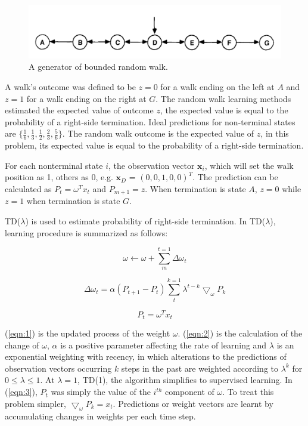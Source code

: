 \documentclass[conference]{IEEEtran}
\begin{document}
\begin{figure}[htbp]
\includegraphics[width=\linewidth]{randomwalk.png}
\caption{A generator of bounded random walk.}
\label{fig1}
\end{figure}

A walk's outcome was defined to be $z = 0$ for a walk ending on the left at $A$ and $z = 1$ for a walk ending on the right at $G$. The random walk learning methods estimated the expected value of outcome $z$, the expected value is equal to the probability of a right-side termination. Ideal predictions for non-terminal states are $\{\frac{1}{6}, \frac{1}{3}, \frac{1}{2}, \frac{2}{3}, \frac{5}{6}\}$. The random walk outcome is the expected value of $z$, in this problem, its expected value is equal to the probability of a right-side termination. 

For each nonterminal state $i$, the observation vector $\textbf{x}_i$, which will set the walk position as 1, others as 0, e.g. $\textbf{x}_D$ = $(0,0,1,0,0)^T$. The prediction can be calculated as $P_t = \omega^Tx_t$ and $P_{m+1} = z$. When termination is state $A$, $z = 0$ while $z = 1$ when termination is state $G$.

TD($\lambda$) is used to estimate probability of right-side termination. In TD($\lambda$), learning procedure is summarized as follows:

\begin{equation}\label{eqn:1}
    \omega \leftarrow \omega + \sum_{m}^{t=1}\Delta \omega_t
  \end{equation}

\begin{equation}\label{eqn:2}
    \Delta \omega_t = \alpha (P_{t+1}-P_t)\sum_{t}^{k=1}\lambda ^{t-k}\bigtriangledown _\omega P_k
\end{equation}

\begin{equation}\label{eqn:3}
    P_t = \omega^Tx_t
\end{equation}


(\ref{eqn:1}) is the updated process of the weight $\omega$. (\ref{eqn:2}) is the calculation of the change of $\omega$, $\alpha$ is a positive parameter affecting the rate of learning and $\lambda$ is an exponential weighting with recency, in which alterations to the predictions of observation vectors occurring $k$ steps in the past are weighted according to $\lambda^k$ for $0 \leq \lambda \leq 1$. At $\lambda = 1$, TD(1), the algorithm simplifies to supervised learning. In (\ref{eqn:3}), $P_t$ was simply the value  of the $i^{th}$ component of $\omega$. To treat this problem simpler, $\bigtriangledown_\omega P_k = x_t$. Predictions or weight vectors are learnt by accumulating changes in weights per each time step. 
\end{document}
